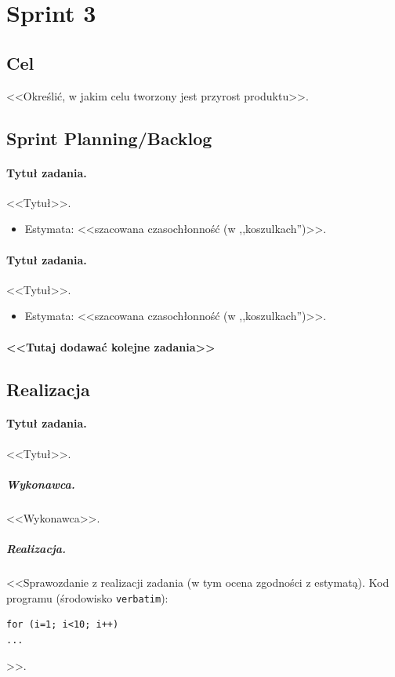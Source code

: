 \documentclass[a4paper]{article}
\begin{document}
\section{Sprint 3}

\subsection{Cel} <<Określić, w jakim celu tworzony jest przyrost produktu>>.

\subsection{Sprint Planning/Backlog}

\paragraph{Tytuł zadania.} <<Tytuł>>.
\begin{itemize}
\item Estymata: <<szacowana czasochłonność (w ,,koszulkach'')>>.
\end{itemize}

\paragraph{Tytuł zadania.} <<Tytuł>>.
\begin{itemize}
\item Estymata: <<szacowana czasochłonność (w ,,koszulkach'')>>.
\end{itemize}

\paragraph{<<Tutaj dodawać kolejne zadania>>}

\subsection{Realizacja}

\paragraph{Tytuł zadania.} <<Tytuł>>.
\subparagraph{Wykonawca.} <<Wykonawca>>.
\subparagraph{Realizacja.} <<Sprawozdanie z realizacji zadania (w tym ocena zgodności z estymatą). Kod programu (środowisko \texttt{verbatim}): \begin{verbatim}
for (i=1; i<10; i++)
...
\end{verbatim}>>.
\end{document}
